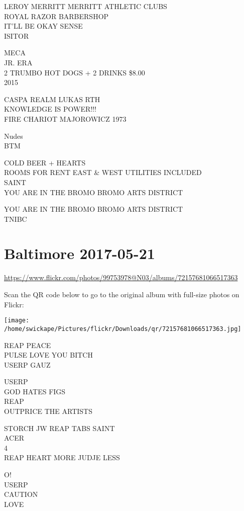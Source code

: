 \documentclass[10pt,letterpaper]{article}
\begin{document}
LEROY MERRITT MERRITT ATHLETIC CLUBS\\
ROYAL RAZOR BARBERSHOP\\
IT'LL BE OKAY SENSE\\
ISITOR

MECA\\
JR. ERA\\
2 TRUMBO HOT DOGS + 2 DRINKS \$8.00\\
2015

CASPA REALM LUKAS RTH\\
KNOWLEDGE IS POWER!!!\\
FIRE CHARIOT MAJOROWICZ 1973

Nudes\\
BTM

COLD BEER + HEARTS\\
ROOMS FOR RENT EAST \& WEST UTILITIES INCLUDED\\
SAINT\\
YOU ARE IN THE BROMO BROMO ARTS DISTRICT

YOU ARE IN THE BROMO BROMO ARTS DISTRICT\\
TNIBC
\pagebreak

\section*{Baltimore 2017-05-21}

\url{https://www.flickr.com/photos/99753978@N03/albums/72157681066517363}

Scan the QR code below to go to the original album with full-size photos on Flickr:

\texttt{[image: /home/swickape/Pictures/flickr/Downloads/qr/72157681066517363.jpg]}
\pagebreak

REAP PEACE\\
PULSE LOVE YOU BITCH\\
USERP GAUZ

USERP\\
GOD HATES FIGS\\
REAP\\
OUTPRICE THE ARTISTS

STORCH JW REAP TABS SAINT\\
ACER\\
4\\
REAP HEART MORE JUDJE LESS

O!\\
USERP\\
CAUTION\\
LOVE
\end{document}
